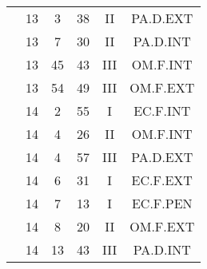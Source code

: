\documentclass[12pt, a4paper]{article}
\begin{document}
\begin{multicols}{3}
{\begin{tabular}{c c c c c c}
	 	 	 	 & 13 & 3 & 38 & II & PA.D.EXT\\%
	 	 	 	 & 13 & 7 & 30 & II & PA.D.INT\\%
	 	 	 	 & 13 & 45 & 43 & III & OM.F.INT\\%
	 	 	 	 & 13 & 54 & 49 & III & OM.F.EXT\\%
	 	 	 	 & 14 & 2 & 55 & I & EC.F.INT\\%
	 	 	 	 & 14 & 4 & 26 & II & OM.F.INT\\%
	 	 	 	 & 14 & 4 & 57 & III & PA.D.EXT\\%
	 	 	 	 & 14 & 6 & 31 & I & EC.F.EXT\\%
	 	 	 	 & 14 & 7 & 13 & I & EC.F.PEN\\%
	 	 	 	 & 14 & 8 & 20 & II & OM.F.EXT\\%
	 	 	 	 & 14 & 13 & 43 & III & PA.D.INT\\%
	 	 \end{tabular}
 	}
\end{multicols}
\end{document}

